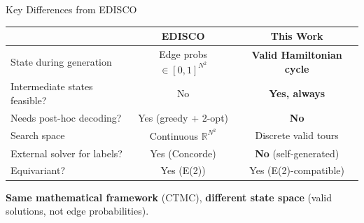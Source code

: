 \documentclass[aspectratio=169,12pt]{beamer}
\begin{document}
\begin{frame}{Key Differences from EDISCO}

\begin{table}[h]
\centering
\renewcommand{\arraystretch}{1.3}
\begin{tabular}{@{}lcc@{}}
\toprule
& \textbf{EDISCO} & \textbf{This Work} \\
\midrule
State during generation & Edge probs $\in [0,1]^{N^2}$ & \textcolor{feasgreen}{\textbf{Valid Hamiltonian cycle}} \\
Intermediate states feasible? & \textcolor{warnred}{No} & \textcolor{feasgreen}{\textbf{Yes, always}} \\
Needs post-hoc decoding? & \textcolor{warnred}{Yes} (greedy + 2-opt) & \textcolor{feasgreen}{\textbf{No}} \\
Search space & Continuous $\mathbb{R}^{N^2}$ & Discrete valid tours \\
External solver for labels? & \textcolor{warnred}{Yes} (Concorde) & \textcolor{feasgreen}{\textbf{No}} (self-generated) \\
Equivariant? & Yes (E(2)) & Yes (E(2)-compatible) \\
\bottomrule
\end{tabular}
\end{table}

\vspace{0.5em}
\textbf{Same mathematical framework} (CTMC), \textbf{different state space} (valid solutions, not edge probabilities).

\end{frame}
\end{document}
